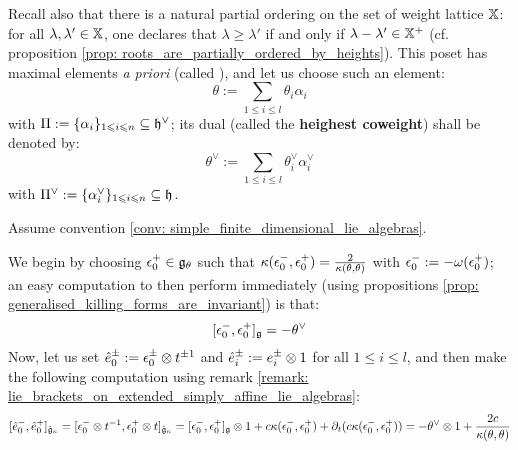 \begin{convention}
            Recall also that there is a natural partial ordering on the set of weight lattice $\mathbb{X}$: for all $\lambda, \lambda' \in \mathbb{X}$, one declares that $\lambda \geq \lambda'$ if and only if $\lambda - \lambda' \in \mathbb{X}^+$ (cf. proposition \ref{prop: roots_are_partially_ordered_by_heights}). This poset has maximal elements \textit{a priori} (called ), and let us choose such an element:
                $$\theta := \sum_{1 \leq i \leq l} \theta_i \alpha_i$$
            with $\Pi := \{\alpha_i\}_{1 \leqslant i \leqslant n} \subseteq \mathfrak{h}^{\vee}$; its dual (called the \textbf{heighest coweight}) shall be denoted by:
                $$\theta^{\vee} := \sum_{1 \leq i \leq l} \theta_i^{\vee} \alpha_i^{\vee}$$
            with $\Pi^{\vee} := \{\alpha_i^{\vee}\}_{1 \leqslant i \leqslant n} \subseteq \mathfrak{h}$.
        \end{convention}
        \begin{convention} \label{conv: extra_generators_for_extended_simply_affine_lie_algebras}
             Assume convention \ref{conv: simple_finite_dimensional_lie_algebras}.
             
             We begin by choosing $\epsilon_0^+ \in \mathfrak{g}_{\theta}$ such that $\kappa(\epsilon_0^-, \epsilon_0^+) = \frac{2}{\kappa(\theta, \theta)}$ with $\epsilon_0^- := -\omega(\epsilon_0^+)$; an easy computation to then perform immediately (using propositions \ref{prop: generalised_killing_forms_are_invariant}) is that:
                $$[\epsilon_0^-, \epsilon_0^+]_{\mathfrak{g}} = -\theta^{\vee}$$
            Now, let us set $\hat{e}_0^{\pm} := \e_0^{\pm} \tensor t^{\pm 1}$ and $\hat{e}_i^{\pm} := e_i^{\pm} \tensor 1$ for all $1 \leq i \leq l$, and then make the following computation using remark \ref{remark: lie_brackets_on_extended_simply_affine_lie_algebras}:
                $$[\hat{e}_0^-, \hat{e}_0^+]_{\hat{\g}_{\kappa}} = [\e_0^- \tensor t^{-1}, \e_0^+ \tensor t]_{\hat{\g}_{\kappa}} = [\e_0^-, \e_0^+]_{\g} \tensor 1 + c \kappa(\e_0^-, \e_0^+) + \del_t(c \kappa(\e_0^-, \e_0^+)) = -\theta^{\vee} \tensor 1 + \frac{2c}{\kappa(\theta, \theta)}$$
        \end{convention}
